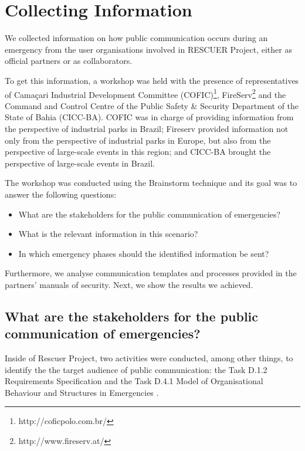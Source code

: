 \section{Collecting Information}

We collected information on how public communication occurs during an emergency from the user organisations involved in RESCUER Project, either as official partners or as collaborators. 

To get this information, a workshop was held with the presence of representatives of Camaçari Industrial Development Committee (COFIC)\footnote{http://coficpolo.com.br/}, FireServ\footnote{http://www.fireserv.at/} and the Command and Control Centre of the Public Safety \& Security Department of the State of Bahia (CICC-BA). COFIC was in charge of providing information from the perspective of industrial parks in Brazil; Fireserv provided information not only from the perspective of industrial parks in Europe, but also from the perspective of large-scale events in this region; and CICC-BA brought the perspective of large-scale events in Brazil.

The workshop was conducted using the Brainstorm technique \cite{diehl1991productivity} and its goal was to answer the
following questions:

\begin{itemize}
   \item What are the stakeholders for the public communication of emergencies?
   \item What is the relevant information in this scenario?
   \item In which emergency phases should the identified information be sent?

 \end{itemize}


Furthermore, we analyse communication templates and processes provided in the partners’ manuals of security. Next, we show the results we achieved.

\subsection*{What are the stakeholders for the public communication of emergencies?}

Inside of Rescuer Project, two activities were conducted, among other things, to identify the the target audience of public communication: the Task D.1.2 Requirements Specification \cite{rescuerD11} and the Task D.4.1 Model of Organisational Behaviour and Structures in Emergencies \cite{rescuerD41}. 

